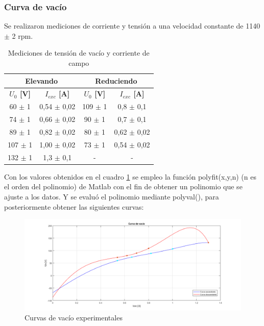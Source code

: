 \documentclass[11pt,letterpaper]{article}     %
\begin{document}
\subsubsection{Curva de vacío}
Se realizaron mediciones de corriente y tensión a una velocidad constante de 1140 $\pm$ 2 rpm.
\begin{table}[H]
	\centering
	\caption{Mediciones de tensión de vacío y corriente de campo}
	\label{MedCurvaVacio}
	\begin{tabular}{|c|c|c|c|}
		\hline
		\multicolumn{2}{|c|}{Elevando}                        & \multicolumn{2}{c|}{Reduciendo}                       \\ \hline
		\textbf{$U_{0}$ {[}V{]}} & \textbf{$I_{exc}$ {[}A{]}} & \textbf{$U_{0}$ {[}V{]}} & \textbf{$I_{exc}$ {[}A{]}} \\ \hline
		60 $\pm$ 1               & 0,54 $\pm$ 0,02            & 109 $\pm$ 1              & 0,8 $\pm$ 0,1              \\ \hline
		74 $\pm$ 1               & 0,66 $\pm$ 0,02            & 90 $\pm$ 1               & 0,7 $\pm$ 0,1              \\ \hline
		89 $\pm$ 1               & 0,82 $\pm$ 0,02            & 80 $\pm$ 1               & 0,62 $\pm$ 0,02            \\ \hline
		107 $\pm$ 1              & 1,00 $\pm$ 0,02            & 73 $\pm$ 1               & 0,54 $\pm$ 0,02            \\ \hline
		132 $\pm$ 1              & 1,3 $\pm$ 0,1              & -                        & -                          \\ \hline
	\end{tabular}
\end{table}
Con los valores obtenidos en el cuadro \ref{MedCurvaVacio} se empleo la función polyfit(x,y,n) (n es el orden del polinomio) de Matlab con el fin de obtener un polinomio que se ajuste a los datos. Y se evaluó el polinomio mediante polyval(), para posteriormente obtener las siguientes curvas:
\begin{figure}[H]
	\centering
	\includegraphics[scale=0.5]{./recursos-Lab6/curvaDeVacioExp.png}
	\caption{Curvas de vacío experimentales}
	\label{fig:curvaDeVacioExp}
\end{figure}
\end{document}
